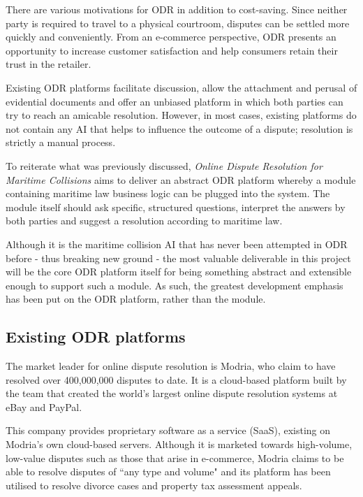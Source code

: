 There are various motivations for ODR in addition to cost-saving. Since neither party is required to travel to a physical courtroom, disputes can be settled more quickly and conveniently. From an e-commerce perspective, ODR presents an opportunity to increase customer satisfaction and help consumers retain their trust in the retailer.

Existing ODR platforms facilitate discussion, allow the attachment and perusal of evidential documents and offer an unbiased platform in which both parties can try to reach an amicable resolution. However, in most cases, existing platforms do not contain any AI that helps to influence the outcome of a dispute; resolution is strictly a manual process.

To reiterate what was previously discussed, \emph{Online Dispute Resolution for Maritime Collisions} aims to deliver an abstract ODR platform whereby a module containing maritime law business logic can be plugged into the system. The module itself should ask specific, structured questions, interpret the answers by both parties and suggest a resolution according to maritime law.

Although it is the maritime collision AI that has never been attempted in ODR before - thus breaking new ground - the most valuable deliverable in this project will be the core ODR platform itself for being something abstract and extensible enough to support such a module. As such, the greatest development emphasis has been put on the ODR platform, rather than the module.

\subsection{Existing ODR platforms}

The market leader for online dispute resolution is Modria, who claim to have resolved over 400,000,000 disputes to date. It is a cloud-based platform built by the team that created the world's largest online dispute resolution systems at eBay and PayPal.~\cite{modria:about}

This company provides proprietary software as a service (SaaS), existing on Modria's own cloud-based servers. Although it is marketed towards high-volume, low-value disputes such as those that arise in e-commerce, Modria claims to be able to resolve disputes of ``any type and volume" and its platform has been utilised to resolve divorce cases and property tax assessment appeals.~\cite{modria:interview}

